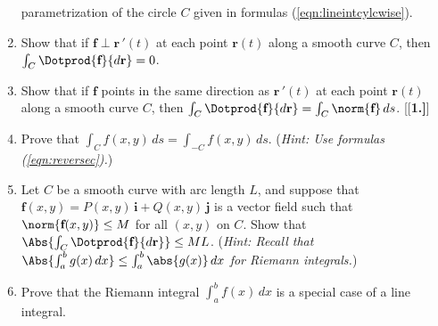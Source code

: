 \begin{multicols}{2}
\begin{enumerate}[\bfseries 1.]
  parametrization of the circle $C$ given in formulas (\ref{eqn:lineintcylcwise}).
 \item Show that if $\textbf{f} \perp \textbf{r}\,'(t)$ at each point $\textbf{r}(t)$ along a smooth curve $C$, then
  $\int_C \Dotprod{\textbf{f}}{d\textbf{r}} = 0$.
 \item Show that if $\textbf{f}$ points in the same direction as $\textbf{r}\,'(t)$ at each point $\textbf{r}(t)$ along
  a smooth curve $C$, then $\int_C \Dotprod{\textbf{f}}{d\textbf{r}} = \int_C \norm{\textbf{f}}\,ds$.
[{[\bfseries 1.]}]
 \item Prove that $\int_C f(x,y)\,ds = \int_{-C} f(x,y)\,ds$. (\emph{Hint: Use formulas (\ref{eqn:reversec}).})
 \item Let $C$ be a smooth curve with arc length $L$, and suppose that $\textbf{f}(x,y) = P(x,y)\,\textbf{i} +
  Q(x,y)\,\textbf{j}$ is a vector field such that $\norm{\textbf{f}(x,y)} \le M$ for all $(x,y)$ on $C$. Show
  that\\$\Abs{\int_C \Dotprod{\textbf{f}}{d\textbf{r}}} \le ML$.
  (\emph{Hint: Recall that $\Abs{\int_a^b g(x)\,dx} \le \int_a^b \abs{g(x)}\,dx$ for Riemann integrals.})
 \item Prove that the Riemann integral $\int_a^b f(x)\,dx$ is a special case of a line integral.
\end{enumerate}
\end{multicols}

